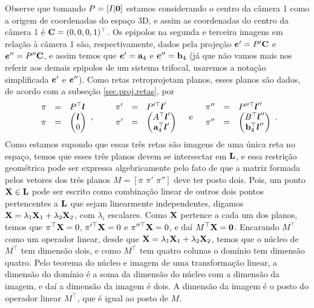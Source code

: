 Observe que tomando $P=[I|{\bf 0}]$ estamos considerando o centro da câmera 1 como a origem de coordenadas do espaço 3D, e assim as coordenadas do centro da câmera 1 é ${\bf C}=(0,0,0,1)^\top$. Os epipolos na segunda e terceira imagens em relação à câmera 1 são, respectivamente, dados pela projeção $\boldsymbol{e}'=P'{\bf C}$ e $\boldsymbol{e}''=P''{\bf C}$, e assim temos que $\boldsymbol{e}'={\bf a}_4$ e $\boldsymbol{e}''={\bf b}_4$ (já que não vamos mais nos referir aos demais epipolos de um sistema trifocal, usaremos a notação simplificada $\boldsymbol{e}'$ e $\boldsymbol{e}''$). Como retas retroprojetam planos, esses planos são dados, de acordo com a subseção \ref{sec.proj.retas}, por
\begin{equation*}
\begin{array}{rcl}
\pi&=&P^\top\boldsymbol{l}\\
\pi&=&
\begin{pmatrix}
\boldsymbol{l}\\
0
\end{pmatrix}
\end{array},\qquad
\begin{array}{rcl}
\pi'&=&P'^\top\boldsymbol{l}'\\
\pi'&=&
\begin{pmatrix}
A^\top\boldsymbol{l}'\\
{\bf a}^\top_4\boldsymbol{l}'
\end{pmatrix}
\end{array}\quad\text{e}\quad
\begin{array}{rcl}
\pi''&=&P''^\top\boldsymbol{l}''\\
\pi''&=&
\begin{pmatrix}
B^\top\boldsymbol{l}''\\
{\bf b}^\top_4\boldsymbol{l}''
\end{pmatrix}
\end{array}.
\end{equation*}
Como estamos supondo que essas três retas são imagens de uma única reta no espaço, temos que esses três planos devem se intersectar em ${\bf L}$, e essa restrição geométrica pode ser expressa algebricamente pelo fato de que a matriz formada pelos vetores dos três planos $M=[\pi \,\,\pi'\,\,\pi'']$ deve ter posto dois. Pois, um ponto $\mathbf{X}\in{\bf L}$ pode ser escrito como combinação linear de outros dois pontos pertencentes a ${\bf L}$ que sejam linearmente independentes, digamos $\mathbf{X}=\lambda_1\mathbf{X}_1+\lambda_2\mathbf{X}_2$, com $\lambda_i$ escalares. Como $\mathbf{X}$ pertence a cada um dos planos, temos que $\pi^\top\mathbf{X}=0$, $\pi'^\top\mathbf{X}=0$ e $\pi''^\top\mathbf{X}=0$, e daí $M^\top\mathbf{X}={\bf 0}$. Encarando $M^\top$ como um operador linear, desde que $\mathbf{X}=\lambda_1\mathbf{X}_1+\lambda_2\mathbf{X}_2$, temos que o núcleo de $M^\top$ tem dimensão dois, e como $M^\top$ tem quatro colunas o domínio tem dimensão quatro. Pelo teorema do núcleo e imagem de uma transformação linear, a dimensão do domínio é a soma da dimensão do núcleo com a dimensão da imagem, e daí a dimensão da imagem é dois. A dimensão da imagem é o posto do operador linear $M^\top$, que é igual ao posto de $M$. 

